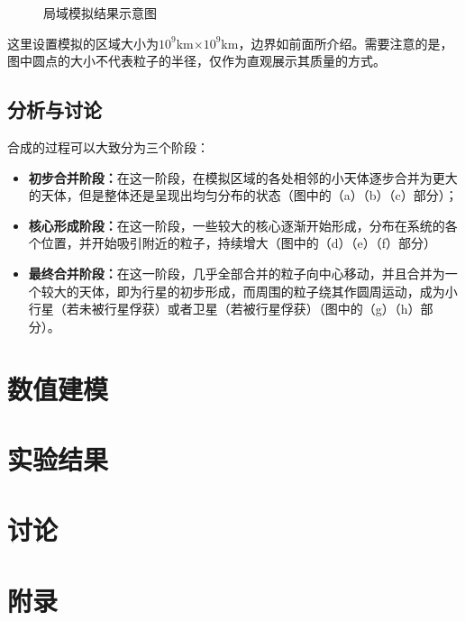 \documentclass[hidelinks]{article}
\begin{document}
\begin{figure}[H]
    \caption{局域模拟结果示意图}
    \label{}
\end{figure}

这里设置模拟的区域大小为$10^9$km$\times$$10^9$km，边界如前面所介绍。需要注意的是，图中圆点的大小不代表粒子的半径，仅作为直观展示其质量的方式。
\subsection{分析与讨论}
合成的过程可以大致分为三个阶段：
\begin{itemize}
    \item \textbf{初步合并阶段：}在这一阶段，在模拟区域的各处相邻的小天体逐步合并为更大的天体，但是整体还是呈现出均匀分布的状态（图中的（a）（b）（c）部分）；
    \item \textbf{核心形成阶段：}在这一阶段，一些较大的核心逐渐开始形成，分布在系统的各个位置，并开始吸引附近的粒子，持续增大（图中的（d）（e）（f）部分）
    \item \textbf{最终合并阶段：}在这一阶段，几乎全部合并的粒子向中心移动，并且合并为一个较大的天体，即为行星的初步形成，而周围的粒子绕其作圆周运动，成为小行星（若未被行星俘获）或者卫星（若被行星俘获）（图中的（g）（h）部分）。
\end{itemize}

\section{数值建模}

\section{实验结果}

\section{讨论}

\section{附录}
\end{document}
